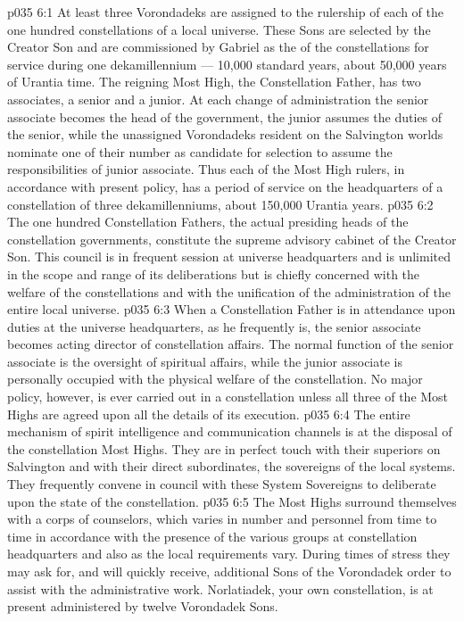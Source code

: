 \vs p035 6:1 At least three Vorondadeks are assigned to the rulership of each of the one hundred constellations of a local universe. These Sons are selected by the Creator Son and are commissioned by Gabriel as the  of the constellations for service during one dekamillennium --- 10,000 standard years, about 50,000 years of Urantia time. The reigning Most High, the Constellation Father, has two associates, a senior and a junior. At each change of administration the senior associate becomes the head of the government, the junior assumes the duties of the senior, while the unassigned Vorondadeks resident on the Salvington worlds nominate one of their number as candidate for selection to assume the responsibilities of junior associate. Thus each of the Most High rulers, in accordance with present policy, has a period of service on the headquarters of a constellation of three dekamillenniums, about 150,000 Urantia years.
\vs p035 6:2 The one hundred Constellation Fathers, the actual presiding heads of the constellation governments, constitute the supreme advisory cabinet of the Creator Son. This council is in frequent session at universe headquarters and is unlimited in the scope and range of its deliberations but is chiefly concerned with the welfare of the constellations and with the unification of the administration of the entire local universe.
\vs p035 6:3 When a Constellation Father is in attendance upon duties at the universe headquarters, as he frequently is, the senior associate becomes acting director of constellation affairs. The normal function of the senior associate is the oversight of spiritual affairs, while the junior associate is personally occupied with the physical welfare of the constellation. No major policy, however, is ever carried out in a constellation unless all three of the Most Highs are agreed upon all the details of its execution.
\vs p035 6:4 The entire mechanism of spirit intelligence and communication channels is at the disposal of the constellation Most Highs. They are in perfect touch with their superiors on Salvington and with their direct subordinates, the sovereigns of the local systems. They frequently convene in council with these System Sovereigns to deliberate upon the state of the constellation.
\vs p035 6:5 The Most Highs surround themselves with a corps of counselors, which varies in number and personnel from time to time in accordance with the presence of the various groups at constellation headquarters and also as the local requirements vary. During times of stress they may ask for, and will quickly receive, additional Sons of the Vorondadek order to assist with the administrative work. Norlatiadek, your own constellation, is at present administered by twelve Vorondadek Sons.
